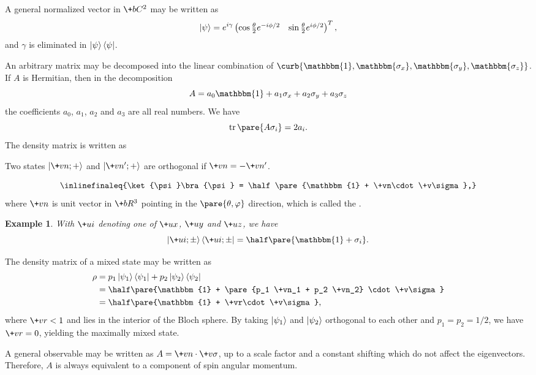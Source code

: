 \documentclass[hidelinks]{article}
\newtheorem{example}{Example}
\begin{document}
A general normalized vector in $\+bC^2$ may be written as
\[ \ket{\psi} = e^{i\gamma}\begin{pmatrix}
    \cos \frac{\theta}{2} e^{-i\phi/2} & \sin \frac{\theta}{2} e^{i\phi/2}
\end{pmatrix}^T, \]
and $\gamma$ is eliminated in $\ket{\psi}\bra{\psi}$.
\par
An arbitrary matrix may be decomposed into the linear combination of $\curb{\mathbbm{1}, \mathbbm{\sigma_x}, \mathbbm{\sigma_y}, \mathbbm{\sigma_z}}$. If $A$ is Hermitian, then in the decomposition
\[ A = a_0 \mathbbm{1} + a_1 \sigma_x + a_2 \sigma_y + a_3 \sigma_z \]
the coefficients $a_0$, $a_1$, $a_2$ and $a_3$ are all real numbers. We have
\[ \trace \pare{A\sigma_i} = 2a_i. \]
The density matrix is written as \begin{marginwarns}
    Two states $\ket{\+vn;+}$ and $\ket{\+vn';+}$ are orthogonal if $\+vn = -\+vn'$.
\end{marginwarns}
\[ \inlinefinaleq{\ket{\psi}\bra{\psi} = \half\pare{\mathbbm{1} + \+vn\cdot \+v\sigma},} \]
where $\+vn$ is unit vector in $\+bR^3$ pointing in the $\pare{\theta,\varphi}$ direction, which is called the .
\begin{sample}
    \begin{example}
        With $\+ui$ denoting one of $\+ux$, $\+uy$ and $\+uz$, we have
        \[ \ket{\+ui;\pm}\bra{\+ui;\pm} = \half\pare{\mathbbm{1} + \sigma_i}. \]
    \end{example}
\end{sample}
The density matrix of a mixed state may be written as
\begin{align*}
    \rho &= p_1 \ket{\psi_1}\bra{\psi_1} + p_2 \ket{\psi_2}\bra{\psi_2} \\
    &= \half\pare{\mathbbm{1} + \pare{p_1 \+vn_1 + p_2 \+vn_2} \cdot \+v\sigma} \\
    &= \half\pare{\mathbbm{1} + \+vr\cdot \+v\sigma},
\end{align*}
where $\+vr < 1$ and lies in the interior of the Bloch sphere. By taking $\ket{\psi_1}$ and $\ket{\psi_2}$ orthogonal to each other and $p_1 = p_2 = 1/2$, we have $\+vr = 0$, yielding the maximally mixed state.
\par
A general observable may be written as $A = \+vn\cdot \+v\sigma$, up to a scale factor and a constant shifting which do not affect the eigenvectors. Therefore, $A$ is always equivalent to a component of spin angular momentum.

\end{document}
